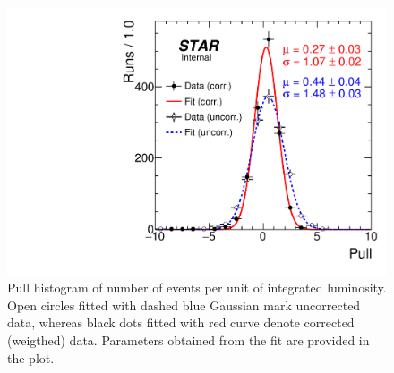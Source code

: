 \begin{figure}[ht!]
\centering%
\parbox{0.4725\textwidth}{%
  \centering%
  \includegraphics[width=\linewidth]{graphics/corrections/PullC.pdf}
}%
\quad%
\parbox{0.4725\textwidth}{%
    \caption[Pull histogram of number of events per unit of integrated luminosity.]{Pull histogram of number of events per unit of integrated luminosity. Open circles fitted with dashed blue Gaussian mark uncorrected data, whereas black dots fitted with red curve denote corrected (weigthed) data. Parameters obtained from the fit are provided in the plot.}\label{fig:pull}%
}
\end{figure}

